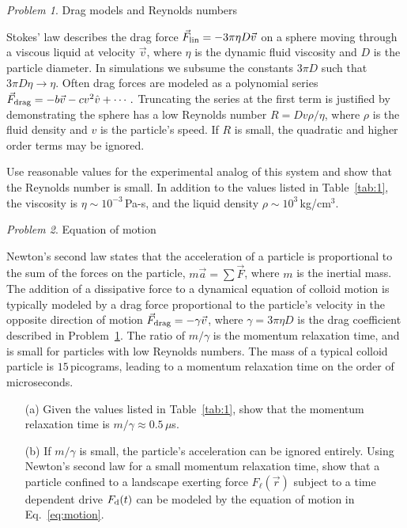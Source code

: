 \documentclass[preprint,showpacs,preprintnumbers,amsmath,amssymb,aps,prb]{revtex4-1}
\theoremstyle{remark}
\newtheorem{problem}{Problem}
\begin{document}
  \begin{problem}{Drag models and Reynolds numbers}
\label{ex:reynolds}

\noindent Stokes' law describes the drag force
  $\vec{F}_{\rm lin} = -3 \pi \eta D \vec{v}$ 
  on a sphere
  moving through a viscous liquid at velocity $\vec{v}$,
  where $\eta$ is the dynamic fluid viscosity and 
  $D$ is the particle diameter.\cite{Taylor2005}
  In simulations we
  subsume the constants $3 \pi D$
  such that $3 \pi D \eta \rightarrow \eta $.
  Often drag forces are
  modeled as a polynomial series\cite{Taylor2005}
$\vec{F}_{\rm drag} = -b \vec{v} - c v^2 \hat{v} + \cdots\,.$
Truncating the series at the first term
  is justified by demonstrating the sphere
  has a low Reynolds number  
  $R = D v \rho / \eta$,
  where $\rho$ is the fluid density and $v$ is the particle's speed.
  If $R$ is small, the quadratic and higher order terms
  may be ignored.

Use reasonable values for the
  experimental analog of this system and show 
that the Reynolds number is small.
In addition to the values listed in Table~\ref{tab:1},
the viscosity is $\eta \sim 10^{-3}$\,Pa-s,\cite{Volpe2013}
and 
the liquid density 
$\rho \sim 10^3$\,kg/cm$^3$.\cite{asce}

\end{problem}


  
\begin{problem}{Equation of motion}
  \label{ex:n2l}

\noindent Newton's second law states that
  the acceleration of a particle 
  is proportional to 
  the sum of the forces on the particle, $m \vec{a} = \sum \vec{F}$,
  where $m$ is the
  inertial mass.  
  The addition of a dissipative force to a dynamical equation 
  of colloid motion 
  is typically modeled
  by a drag force proportional to the particle's velocity
  in the opposite direction of motion 
  $\vec{F}_{\rm drag} = - \gamma \vec{v}$,
  where $\gamma = 3 \pi \eta D$ is the drag coefficient
  described in Problem~\ref{ex:reynolds}.
  The ratio of $m/\gamma$ is 
 the momentum relaxation time,
  and is small for
  particles with low Reynolds numbers.
  The mass of a
  typical colloid particle is $15$\,picograms,
  leading to a momentum relaxation time
  on the order of microseconds.

\begin{enumerate}

\item [(a)] Given  the values listed in Table~\ref{tab:1},
 show that  the momentum relaxation time is 
  $m/\gamma \approx 0.5\,\mu$s. 
  
\item [(b)] If $m/\gamma$ is small, the
  particle's acceleration can be ignored
  entirely.
Using Newton's second law for
  a small momentum relaxation time, 
  show that a particle confined to a landscape exerting force
  $F_\ell(\vec{r})$ subject to a time dependent drive $F_{\rm d}(t)$
  can be modeled by the equation of motion  in 
  Eq.~\eqref{eq:motion}.
  \end{enumerate}
\end{problem}
\end{document}
